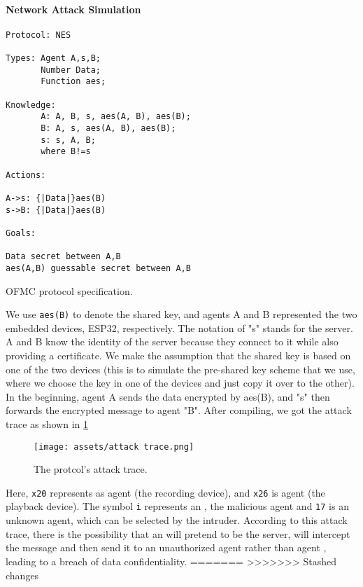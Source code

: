 \documentclass[conference]{IEEEtran}
\begin{document}
\paragraph{Network Attack Simulation}

\begin{listing}[h]
\begin{verbatim}
Protocol: NES

Types: Agent A,s,B;
       Number Data;
       Function aes;

Knowledge: 
       A: A, B, s, aes(A, B), aes(B);
       B: A, s, aes(A, B), aes(B);
       s: s, A, B;
       where B!=s

Actions:

A->s: {|Data|}aes(B)
s->B: {|Data|}aes(B)

Goals:

Data secret between A,B
aes(A,B) guessable secret between A,B
\end{verbatim}
\caption{OFMC protocol specification.}
\end{listing}

We use \texttt{aes(B)} to denote the shared key, and agents A and B represented the two embedded devices, ESP32, respectively.
The notation of "s" stands for the server.
A and B know the identity of the server because they connect to it while also providing a certificate.
We make the assumption that the shared key is based on one of the two devices (this is to simulate the pre-shared key scheme that we use,
where we choose the key in one of the devices and just copy it over to the other).
In the beginning, agent A sends the data encrypted by aes(B), and "s" then forwards the encrypted message to agent "B".
After compiling, we got the attack trace as shown in \cref{fig:attack_trace}

\begin{figure}[h]
	\hspace*{0.4cm}
	\texttt{[image: assets/attack trace.png]}
	\vspace{-0.2cm}
	\caption{The protcol's attack trace.}
	\label{fig:attack_trace}
\end{figure}

Here, \texttt{x20} represents as agent  (the recording device), and \texttt{x26} is agent  (the playback device).
The symbol \texttt{i} represents an , the malicious agent and \texttt{17} is an unknown agent, which can be selected by the intruder.
According to this attack trace, there is the possibility that an  will pretend to be the server, will intercept the message and then send it to an unauthorized agent rather than agent , leading to a breach of data confidentiality.
=======
>>>>>>> Stashed changes
\end{document}

